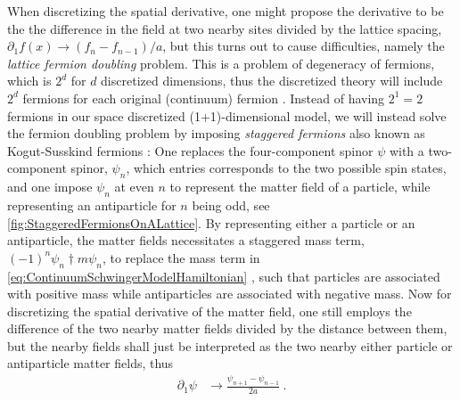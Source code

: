 \documentclass[../main.tex]{subfiles} %
\begin{document}
When discretizing the spatial derivative, one might propose the derivative to be the the difference in the field at two nearby sites divided by the lattice spacing, $\partial_1 f(x) \rightarrow (f_n - f_{n - 1}) / a$, but this turns out to cause difficulties, namely the \emph{lattice fermion doubling} problem. This is a problem of degeneracy of fermions, which is $2^d$ for $d$ discretized dimensions, thus the discretized theory will include $2^d$ fermions for each original (continuum) fermion \cite{GoswamiBandyopadhyay_FermionDoubling_1997}. Instead of having $2^1 = 2$ fermions in our space discretized (1+1)-dimensional model, we will instead solve the fermion doubling problem by imposing \emph{staggered fermions} also known as Kogut-Susskind fermions \cite{susskind_latticeFermions_1977, banksSusskindKogut_StrongCoupling_1976}: One replaces the four-component spinor $\psi$ with a two-component spinor, $\psi_n$, which entries corresponds to the two possible spin states, and one impose $\psi_n$ at even $n$ to represent the matter field of a particle, while representing an antiparticle for $n$ being odd, see \cref{fig:StaggeredFermionsOnALattice}. By representing either a particle or an antiparticle, the matter fields necessitates a staggered mass term, $(-1)^n \psi_n\dagger m \psi_n$, to replace the mass term in \cref{eq:ContinuumSchwingerModelHamiltonian} \cite{susskind_latticeFermions_1977}, such that particles are associated with positive mass while antiparticles are associated with negative mass. Now for discretizing the spatial derivative of the matter field, one still employs the difference of the two nearby matter fields divided by the distance between them, but the nearby fields shall just be interpreted as the two nearby either particle or antiparticle matter fields, thus \cite{susskind_latticeFermions_1977}
\begin{align}
    \partial_1 \psi &\rightarrow \frac{\psi_{n+1} - \psi_{n-1}}{2a} \: .
\end{align}
\end{document}
